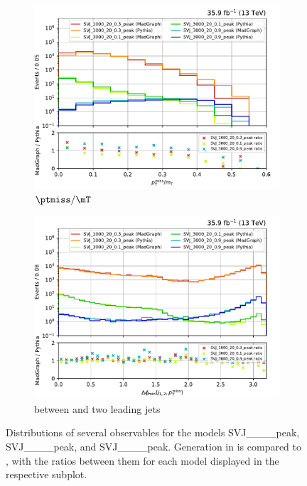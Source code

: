 \begin{figure}[htbp]
    \begin{subfigure}[b]{0.49\textwidth}
        \includegraphics[width=\textwidth]{figures/madgraph_pythia_comparisons/plots/part1/met_over_mt.pdf}
        \caption{$\ptmiss/\mT$}
    \end{subfigure}
    \hfill
    \begin{subfigure}[b]{0.49\textwidth}
        \includegraphics[width=\textwidth]{figures/madgraph_pythia_comparisons/plots/part1/min_dphi.pdf}
        \caption{\mindphi between \ptmiss and two leading \glspl{jet}}
    \end{subfigure}
    \caption[Distributions of several observables for the models SVJ\_\_\_\_\-peak, SVJ\_\_\_\_\-peak, and SVJ\_\_\_\_\-peak]{Distributions of several observables for the models SVJ\_\_\_\_\-peak, SVJ\_\_\_\_\-peak, and SVJ\_\_\_\_\-peak. Generation in \MGvATNLO is compared to \PYTHIAEIGHT, with the ratios between them for each model displayed in the respective subplot.}
    \label{fig:svj_mg_pythia_comparison_set1}
\end{figure}


